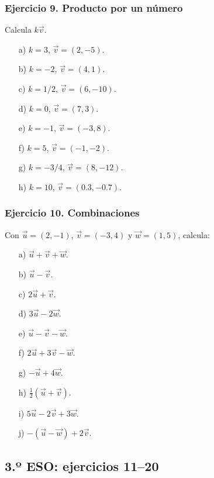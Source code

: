 \subsubsection*{Ejercicio 9. Producto por un número}

Calcula $k\vec{v}$.

\begin{enumerate}
    \item[a)] $k=3$, $\vec{v}=(2,-5)$.
    \item[b)] $k=-2$, $\vec{v}=(4,1)$.
    \item[c)] $k=1/2$, $\vec{v}=(6,-10)$.
    \item[d)] $k=0$, $\vec{v}=(7,3)$.
    \item[e)] $k=-1$, $\vec{v}=(-3,8)$.
    \item[f)] $k=5$, $\vec{v}=(-1,-2)$.
    \item[g)] $k=-3/4$, $\vec{v}=(8,-12)$.
    \item[h)] $k=10$, $\vec{v}=(0.3,-0.7)$.
\end{enumerate}

\subsubsection*{Ejercicio 10. Combinaciones}

Con $\vec{u}=(2,-1)$, $\vec{v}=(-3,4)$ y $\vec{w}=(1,5)$, calcula:

\begin{enumerate}
    \item[a)] $\vec{u}+\vec{v}+\vec{w}$.
    \item[b)] $\vec{u}-\vec{v}$.
    \item[c)] $2\vec{u}+\vec{v}$.
    \item[d)] $3\vec{u}-2\vec{w}$.
    \item[e)] $\vec{u}-\vec{v}-\vec{w}$.
    \item[f)] $2\vec{u}+3\vec{v}-\vec{w}$.
    \item[g)] $-\vec{u}+4\vec{w}$.
    \item[h)] $\frac{1}{2}(\vec{u}+\vec{v})$.
    \item[i)] $5\vec{u}-2\vec{v}+3\vec{w}$.
    \item[j)] $-(\vec{u}-\vec{w})+2\vec{v}$.
\end{enumerate}

\subsection{3.º ESO: ejercicios 11--20}

